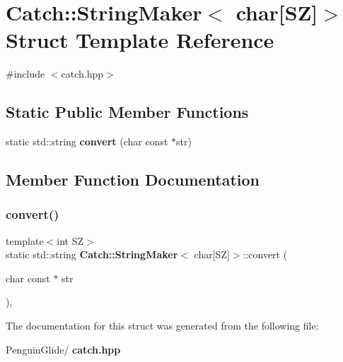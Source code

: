 \section{Catch\+::String\+Maker$<$ char[SZ]$>$ Struct Template Reference}
\label{struct_catch_1_1_string_maker_3_01char[_s_z]_4}


{\ttfamily \#include $<$catch.\+hpp$>$}

\subsection*{Static Public Member Functions}
\begin{DoxyCompactItemize}
\item 
static std\+::string \textbf{ convert} (char const $\ast$str)
\end{DoxyCompactItemize}


\subsection{Member Function Documentation}
\mbox{\label{struct_catch_1_1_string_maker_3_01char[_s_z]_4_a095e415534f9145300271befe9853357}} 
\subsubsection{convert()}
{\footnotesize\ttfamily template$<$int SZ$>$ \\
static std\+::string \textbf{ Catch\+::\+String\+Maker}$<$ char[SZ]$>$\+::convert (\begin{DoxyParamCaption}\item[{char const $\ast$}]{str }\end{DoxyParamCaption})\hspace{0.3cm}{\ttfamily [inline]}, {\ttfamily [static]}}



The documentation for this struct was generated from the following file\+:\begin{DoxyCompactItemize}
\item 
Penguin\+Glide/\textbf{ catch.\+hpp}\end{DoxyCompactItemize}
